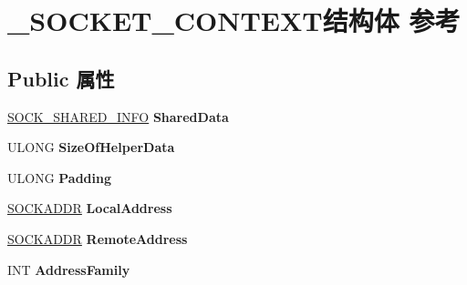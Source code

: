 \hypertarget{struct___s_o_c_k_e_t___c_o_n_t_e_x_t}{}\section{\+\_\+\+S\+O\+C\+K\+E\+T\+\_\+\+C\+O\+N\+T\+E\+X\+T结构体 参考}
\label{struct___s_o_c_k_e_t___c_o_n_t_e_x_t}
\subsection*{Public 属性}
\begin{DoxyCompactItemize}
\item 
\mbox{\label{struct___s_o_c_k_e_t___c_o_n_t_e_x_t_a75130dbf568bafd7eb17abb1946152df}} 
\hyperlink{struct___s_o_c_k___s_h_a_r_e_d___i_n_f_o}{S\+O\+C\+K\+\_\+\+S\+H\+A\+R\+E\+D\+\_\+\+I\+N\+FO} {\bfseries Shared\+Data}
\item 
\mbox{\label{struct___s_o_c_k_e_t___c_o_n_t_e_x_t_af972ca0849c2c385099cdea06b79679c}} 
U\+L\+O\+NG {\bfseries Size\+Of\+Helper\+Data}
\item 
\mbox{\label{struct___s_o_c_k_e_t___c_o_n_t_e_x_t_ab997764f3d857185d477f0fc9f654a4a}} 
U\+L\+O\+NG {\bfseries Padding}
\item 
\mbox{\label{struct___s_o_c_k_e_t___c_o_n_t_e_x_t_aecb338efafeeb8b1c603ccfca7d1234e}} 
\hyperlink{structsockaddr}{S\+O\+C\+K\+A\+D\+DR} {\bfseries Local\+Address}
\item 
\mbox{\label{struct___s_o_c_k_e_t___c_o_n_t_e_x_t_abddbbfe074928a081beb81262e25aa3f}} 
\hyperlink{structsockaddr}{S\+O\+C\+K\+A\+D\+DR} {\bfseries Remote\+Address}
\item 
\mbox{\label{struct___s_o_c_k_e_t___c_o_n_t_e_x_t_ac90b1e4f6ab1e734c87a0204144342bd}} 
I\+NT {\bfseries Address\+Family}
\item 
\mbox{\label{struct___s_o_c_k_e_t___c_o_n_t_e_x_t_a542ef51ebaca8c156cd6c181303c8bb3}} 

\end{DoxyCompactItemize}
